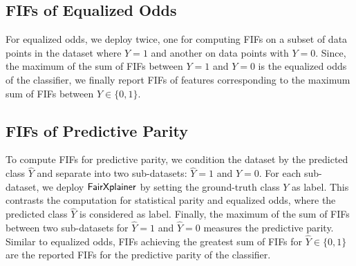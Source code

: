 \subsection{FIFs of Equalized Odds}  For equalized odds, we deploy {\fairXplainer} twice, one for computing FIFs on a subset of data points in the dataset where $ Y = 1 $ and another on data points with $ Y = 0 $. Since, the maximum of the sum of FIFs between $ Y = 1 $ and $ Y = 0 $ is the equalized odds of the classifier, we finally report FIFs of features corresponding to the maximum sum of FIFs between $ Y \in \{0, 1\} $.





\subsection{FIFs of Predictive Parity}  To compute FIFs for predictive parity, we condition the dataset by the predicted class $ \widehat{Y} $ and separate into two sub-datasets: $ \widehat{Y} = 1 $ and  $ \widehat{Y} = 0 $. For each sub-dataset, we deploy $ \mathsf{FairXplainer} $ by setting the ground-truth class $ Y $ as label. This contrasts the computation for  statistical parity and equalized odds, where the predicted class $ \widehat{Y} $ is considered as label. Finally, the maximum of the sum of FIFs between two sub-datasets for $ \widehat{Y} = 1 $ and  $ \widehat{Y} = 0 $ measures the predictive parity. Similar to equalized odds, FIFs achieving the greatest sum of FIFs for $ \widehat{Y} \in \{0, 1\} $ are the reported FIFs for the predictive parity of the classifier.



